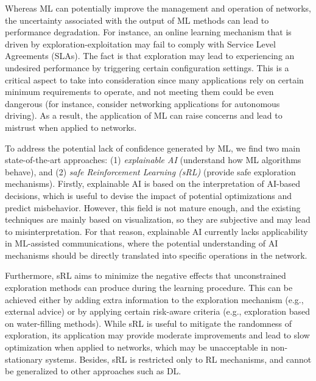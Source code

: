 \documentclass[journal]{IEEEtran}
\begin{document}
	Whereas ML can potentially improve the management and operation of networks, the uncertainty associated with the output of ML methods can lead to performance degradation. For instance, an online learning mechanism that is driven by exploration-exploitation may fail to comply with Service Level Agreements (SLAs). The fact is that exploration may lead to experiencing an undesired performance by triggering certain configuration settings. This is a critical aspect to take into consideration since many applications rely on certain minimum requirements to operate, and not meeting them could be even dangerous (for instance, consider networking applications for autonomous driving). As a result, the application of ML can raise concerns and lead to mistrust when applied to networks.
	
	To address the potential lack of confidence generated by ML, we find two main state-of-the-art approaches: (1) \textit{explainable AI} \cite{samek} (understand how ML algorithms behave), and (2) \textit{safe Reinforcement Learning (sRL)} \cite{safe} (provide safe exploration mechanisms). Firstly, explainable AI is based on the interpretation of AI-based decisions, which is useful to devise the impact of potential optimizations and predict misbehavior. However, this field is not mature enough, and the existing techniques are mainly based on visualization, so they are subjective and may lead to misinterpretation. For that reason, explainable AI currently lacks applicability in ML-assisted communications, where the potential understanding of AI mechanisms should be directly translated into specific operations in the network.
	
	Furthermore, sRL aims to minimize the negative effects that unconstrained exploration methods can produce during the learning procedure. This can be achieved either by adding extra information to the exploration mechanism (e.g., external advice) or by applying certain risk-aware criteria (e.g., exploration based on water-filling methods). While sRL is useful to mitigate the randomness of exploration, its application may provide moderate improvements and lead to slow optimization when applied to networks, which may be unacceptable in non-stationary systems. Besides, sRL is restricted only to RL mechanisms, and cannot be generalized to other approaches such as DL.
	
\end{document}
